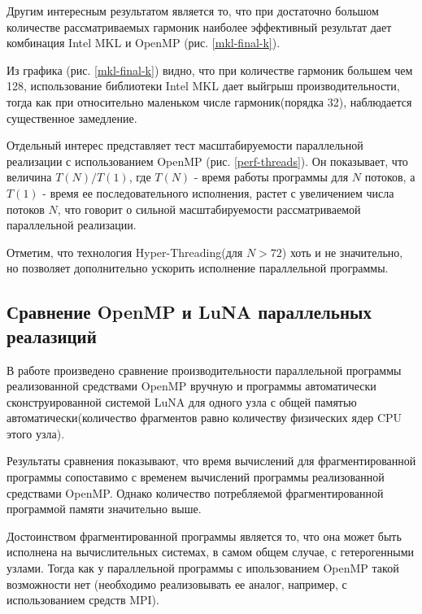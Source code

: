 Другим интересным результатом является то, что при достаточно большом количестве рассматриваемых гармоник
наиболее эффективный результат дает комбинация Intel MKL и OpenMP (рис. \ref{mkl-final-k}).

Из графика (рис. \ref{mkl-final-k}) видно, что при количестве гармоник большем чем 128, использование библиотеки Intel MKL
дает выйгрыш производительности, тогда как при относительно маленьком числе гармоник(порядка 32), наблюдается существенное замедление.


Отдельный интерес представляет тест масштабируемости параллельной реализации с использованием OpenMP (рис. \ref{perf-threads}).
Он показывает, что величина $T(N)/T(1)$, где $T(N)$ - время работы программы для $N$ потоков, а $T(1)$ - время ее последовательного исполнения, растет с увеличением числа потоков $N$, что говорит о сильной масштабируемости рассматриваемой параллельной реализации.


Отметим, что технология Hyper-Threading(для $N>72$) хоть и не значительно, но позволяет дополнительно ускорить исполнение параллельной программы.

\subsection{Сравнение OpenMP и LuNA параллельных реалазиций}
В работе произведено сравнение производительности параллельной программы реализованной средствами OpenMP вручную
и программы автоматически сконструированной системой LuNA для одного узла с общей памятью автоматически(количество фрагментов
равно количеству физических ядер CPU этого узла).

Результаты сравнения показывают, что время вычислений для фрагментированной программы сопоставимо с временем вычислений
программы реализованной средствами OpenMP. Однако количество потребляемой фрагментированной программой памяти значительно выше.

Достоинством фрагментированной программы является то, что она может быть исполнена на
вычислительных системах, в самом общем случае, с гетерогенными узлами.
Тогда как у параллельной программы с ипользованием OpenMP такой возможности нет
(необходимо реализовывать ее аналог, например, с использованием средств MPI).

